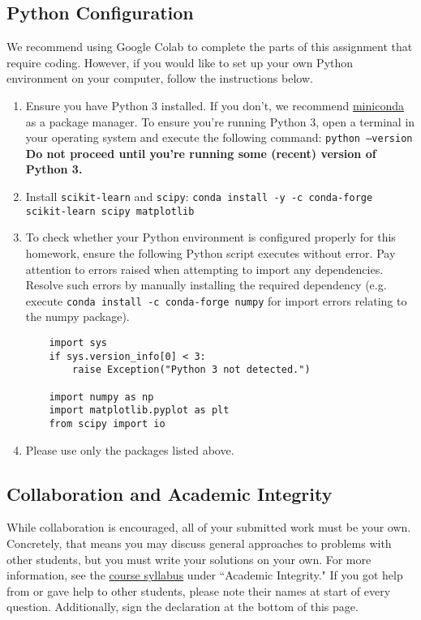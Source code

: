 \documentclass[10pt]{article}
\begin{document}
\subsection*{Python Configuration}
We recommend using Google Colab to complete the parts of this assignment that require coding. However, if you would like to set up your own Python environment on your computer, follow the instructions below. 
\begin{enumerate}
    \item Ensure you have Python 3 installed. If you don't, we recommend \href{https://conda.io/projects/conda/en/stable/user-guide/install/macos.html#install-macos-silent}{miniconda} as a package manager. To ensure you're running Python 3, open a terminal in your operating system and execute the following command: \texttt{python --version}
    \textbf{Do not proceed until you're running some (recent) version of Python 3.}
    \item Install \texttt{scikit-learn} and \texttt{scipy}: \newline\texttt{conda install -y -c conda-forge scikit-learn scipy matplotlib}
    \item To check whether your Python environment is configured properly for this homework, ensure the following Python script executes without error. Pay attention to errors raised when attempting to import any dependencies. Resolve such errors by manually installing the required dependency (e.g. execute \verb|conda install -c conda-forge numpy| for import errors relating to the numpy package).
    \begin{verbatim}
    import sys
    if sys.version_info[0] < 3:
        raise Exception("Python 3 not detected.")
    
    import numpy as np
    import matplotlib.pyplot as plt
    from scipy import io
    \end{verbatim}
    \item Please use only the packages listed above.
\end{enumerate}

\subsection*{Collaboration and Academic Integrity}

While collaboration is encouraged, all of your submitted work must be your own. Concretely, that means you may discuss general approaches to problems with other students, but you must write your solutions on your own. For more information, see the  \href{https://canvas.sfu.ca/courses/67692/assignments/syllabus}{course syllabus} under ``Academic Integrity." If you got help from or gave help to other students, please note their names at start of every question. Additionally, sign the declaration at the bottom of this page. 
\end{document}
